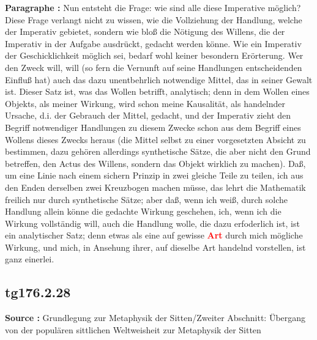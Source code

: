 \documentclass[a4paper,12pt,twoside]{book}
\newcommand{\match}[1]{\textcolor{red}{\textbf{#1}}}
\begin{document}
	\noindent\textbf{Paragraphe : }Nun entsteht die Frage: wie sind alle diese Imperative möglich? Diese Frage verlangt nicht zu wissen, wie die Vollziehung der Handlung, welche der Imperativ gebietet, sondern wie bloß die Nötigung des Willens, die der Imperativ in der Aufgabe ausdrückt, gedacht werden könne. Wie ein Imperativ der Geschicklichkeit möglich sei, bedarf wohl keiner besondern Erörterung. Wer den Zweck will, will (so fern die Vernunft auf seine Handlungen entscheidenden Einfluß hat) auch das dazu unentbehrlich notwendige Mittel, das in seiner Gewalt ist. Dieser Satz ist, was das Wollen betrifft, analytisch; denn in dem Wollen eines Objekts, als meiner Wirkung, wird schon meine Kausalität, als handelnder Ursache, d.i. der Gebrauch der Mittel, gedacht, und der Imperativ zieht den Begriff notwendiger Handlungen zu diesem Zwecke schon aus dem Begriff eines Wollens dieses Zwecks heraus (die Mittel selbst zu einer vorgesetzten Absicht  zu bestimmen, dazu gehören allerdings synthetische Sätze, die aber nicht den Grund betreffen, den Actus des Willens, sondern das Objekt wirklich zu machen). Daß, um eine Linie nach einem sichern Prinzip in zwei gleiche Teile zu teilen, ich aus den Enden derselben zwei Kreuzbogen machen müsse, das lehrt die Mathematik freilich nur durch synthetische Sätze; aber daß, wenn ich weiß, durch solche Handlung allein könne die gedachte Wirkung geschehen, ich, wenn ich die Wirkung vollständig will, auch die Handlung wolle, die dazu erfoderlich ist, ist ein analytischer Satz; denn etwas als eine auf gewisse \match{Art} durch mich mögliche Wirkung, und mich, in Ansehung ihrer, auf dieselbe Art handelnd vorstellen, ist ganz einerlei. 
	
	\subsection*{tg176.2.28} 
	\textbf{Source : }Grundlegung zur Metaphysik der Sitten/Zweiter Abschnitt: Übergang von der populären sittlichen Weltweisheit zur Metaphysik der Sitten\\  
	
\end{document}
